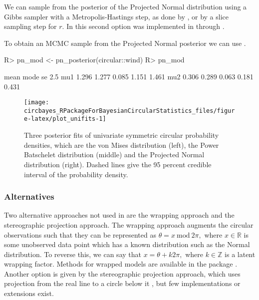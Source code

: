 We can sample from the posterior of the Projected Normal distribution
using a Gibbs sampler \citep{chib1995understanding} with a
Metropolis-Hastings \citep{metropolis1953equation, hastings1970monte}
step, as done by \citet{Nunez-Antonio2005}, or by a slice sampling
\citep{hernandez2017general} step for \(r\). In  this
second option was implemented in  through .

To obtain an MCMC sample from the Projected Normal posterior we can use
.

\begin{CodeChunk}

\begin{CodeInput}
R> pn_mod <- pn_posterior(circular::wind)
R> pn_mod 
\end{CodeInput}

\begin{CodeOutput}
     mean  mode    se  2.5%
mu1 1.296 1.277 0.085 1.151 1.461
mu2 0.306 0.289 0.063 0.181 0.431
\end{CodeOutput}
\end{CodeChunk}

\begin{CodeChunk}
\begin{figure}

{\centering \texttt{[image: circbayes\_RPackageForBayesianCircularStatistics\_files/figure-latex/plot\_unifits-1]} 

}

\caption[Three posterior fits of univariate symmetric circular probability densities, which are the von Mises distribution (left), the Power Batschelet distribution (middle)  and the Projected Normal distribution (right)]{Three posterior fits of univariate symmetric circular probability densities, which are the von Mises distribution (left), the Power Batschelet distribution (middle)  and the Projected Normal distribution (right). Dashed lines give the 95 percent credible interval of the probability density.}\label{fig:plot_unifits}
\end{figure}
\end{CodeChunk}

\hypertarget{alternatives}{%
\subsubsection{Alternatives}\label{alternatives}}

Two alternative approaches not used in  are the wrapping
approach and the stereographic projection approach. The wrapping
approach augments the circular observations such that they can be
represented as \(\theta = x ~\text{mod} ~ 2\pi,\) where
\(x \in \mathbb{R}\) is some unobserved data point which has a known
distribution such as the Normal distribution. To reverse this, we can
say that \(x = \theta + k 2 \pi,\) where \(k \in \mathbb{Z}\) is a
latent wrapping factor. Methods for wrapped models are available in the
package  \citep{nadarajah2017wrapped}. Another option is
given by the stereographic projection approach, which uses projection
from the real line to a circle below it \citep{abe2010symmetric}, but
few implementations or extensions exist.

